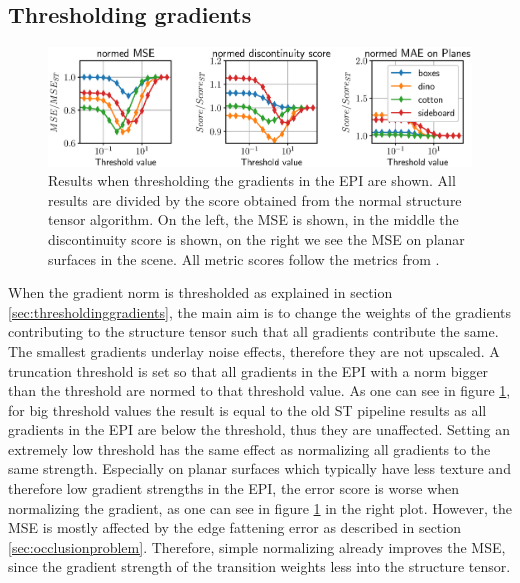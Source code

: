\documentclass  [
  paper    = a4,
  BCOR     = 10mm,
  twoside,
  fontsize = 12pt,
  fleqn,
  toc      = bibnumbered,
  toc      = listofnumbered,
  numbers  = noendperiod,
  headings = normal,
  listof   = leveldown,
  version  = 3.03
]                                       {scrreprt}
\begin{document}
\subsection{Thresholding gradients}
\label{sec:ev_thresh}
\begin{figure}[h!]
	\centering
	\includegraphics[width=1\linewidth]{images/thresh_params}
	\caption[Results when thresholding the gradients in the EPI]{Results when thresholding the gradients in the EPI are shown. All results are divided by the score obtained from the normal structure tensor algorithm. On the left, the MSE is shown, in the middle the discontinuity score is shown, on the right we see the MSE on planar surfaces in the scene. All metric scores follow the metrics from \cite{honauer2016benchmark}. }
	\label{fig:threshparams}
\end{figure}
When the gradient norm is thresholded as explained in section \ref{sec:thresholdinggradients}, the main aim is to change the weights of the gradients contributing to the structure tensor such that all gradients contribute the same. The smallest gradients underlay noise effects, therefore they are not upscaled. A truncation threshold is set so that all gradients in the EPI with a norm bigger than the threshold are normed to that threshold value. As one can see in figure \ref{fig:threshparams}, for big threshold values the result is equal to the old ST pipeline results as all gradients in the EPI are below the threshold, thus they are unaffected.
Setting an extremely low threshold has the same effect as normalizing all gradients to the same strength. Especially on planar surfaces which typically have less texture and therefore low gradient strengths in the EPI, the error score is worse when normalizing the gradient, as one can see in figure \ref{fig:threshparams} in the right plot. However, the MSE is mostly affected by the edge fattening error as described in section \ref{sec:occlusionproblem}. Therefore, simple normalizing already improves the MSE, since the gradient strength of the transition weights less into the structure tensor.
\end{document}

